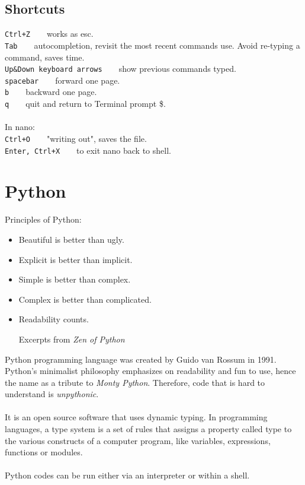 \documentclass{article}
\begin{document}
\subsection{Shortcuts}
\texttt{Ctrl+Z} ~ ~ works as esc.\\
\texttt{Tab}	 ~ ~ 	autocompletion, revisit the most recent commands use. Avoid re-typing a command, saves time.\\
\texttt{Up\&Down keyboard arrows} ~ ~ show previous commands typed.\\
\texttt{spacebar} ~	~ forward one page.\\
\texttt{b} ~ ~  backward one page.\\
\texttt{q} ~	 ~ quit and return to Terminal prompt \$.\\
\\
In nano:\\
\indent
\texttt{Ctrl+O} ~ ~ "writing out", saves the file. \\
\indent
\texttt{Enter, Ctrl+X} ~ ~ to exit nano back to shell.\\

\newpage
\section{Python}


Principles of Python:
\begin{itemize}
\item[]Beautiful is better than ugly.
\item[]Explicit is better than implicit.
\item[]Simple is better than complex.
\item[]Complex is better than complicated.
\item[]Readability counts.

\hfill Excerpts from \textit{Zen of Python} 
\end{itemize}

Python programming language was created by Guido van Rossum in 1991. Python's minimalist philosophy emphasizes on readability and fun to use, hence the name as a tribute to \textit{Monty Python}. Therefore, code that is hard to understand is \textit{unpythonic}.\\
\\
 It is an open source software that uses dynamic typing. In programming languages, a type system is a set of rules that assigns a property called type to the various constructs of a computer program, like variables, expressions, functions or modules. \\
\\
 Python codes can be run either via an interpreter or within a shell.\\
\end{document}
